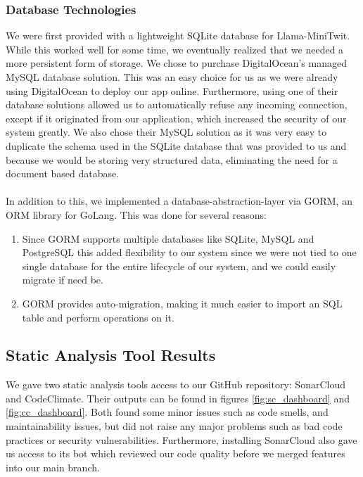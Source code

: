 \documentclass{article}
\begin{document}
\subsubsection{Database Technologies}
We were first provided with a lightweight SQLite database for Llama-MiniTwit. While this worked well for some time, we eventually realized that we needed a more persistent form of storage. We chose to purchase DigitalOcean's managed MySQL database solution. This was an easy choice for us as we were already using DigitalOcean to deploy our app online. Furthermore, using one of their database solutions allowed us to automatically refuse any incoming connection, except if it originated from our application, which increased the security of our system greatly. We also chose their MySQL solution as it was very easy to duplicate the schema used in the SQLite database that was provided to us and because we would be storing very structured data, eliminating the need for a document based database.
\\\\
In addition to this, we implemented a database-abstraction-layer via GORM, an ORM library for GoLang. This was done for several reasons:

\begin{enumerate}
    \item Since GORM supports multiple databases like SQLite, MySQL and PostgreSQL this added flexibility to our system since we were not tied to one single database for the entire lifecycle of our system, and we could easily migrate if need be.
    \item GORM provides auto-migration, making it much easier to import an SQL table and perform operations on it. 
\end{enumerate}

\subsection{Static Analysis Tool Results}
We gave two static analysis tools access to our GitHub repository: SonarCloud and CodeClimate. Their outputs can be found in figures \ref{fig:sc_dashboard} and \ref{fig:cc_dashboard}. Both found some minor issues such as code smells, and maintainability issues, but did not raise any major problems such as bad code practices or security vulnerabilities. Furthermore, installing SonarCloud also gave us access to its bot which reviewed our code quality before we merged features into our main branch.
\end{document}
